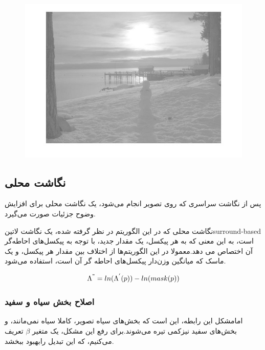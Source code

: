  
 \begin{figure}[!htb]

 		\includegraphics[width=\linewidth]{images/retinexglobal}

 		\caption{}\label{fig:logtonemap}

 		\endminipage\hfill

 \end{figure}
 
 
\subsection{نگاشت محلی}

پس از نگاشت سراسری که روی تصویر انجام می‌شود، یک نگاشت محلی برای افزایش وضوح جزئیات صورت می‌گیرد.

نگاشت محلی که در این الگوریتم در نظر گرفته شده، یک نگاشت 
‌لاتین{surround-based }
  است، به  این معنی که به هر پیکسل، یک مقدار جدید، با توجه به پیکسل‌های احاطه‌گر آن اختصاص می دهد.معمولا در این الگوریتم‌ها از اختلاف بین مقدار هر پیکسل، و یک ماسک که میانگین وزن‌دار پیکسل‌های احاطه گر آن است، استفاده می‌شود.
  


\begin{equation}
	\Lambda^{"} = ln(\Lambda^{'}(p)) - ln(mask(p))
\end{equation}

\subsubsection{اصلاح بخش سیاه و سفید}
امامشکل این رابطه، این است که بخش‌های سیاه تصویر، کاملا سیاه نمی‌مانند، و بخش‌های سفید نیزکمی تیره می‌شوند.برای رفع این مشکل، یک متغیر $ \beta$ تعریف می‌کنیم، که این تبدیل‌ رابهبود ببخشد.



